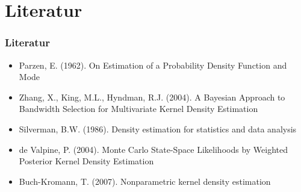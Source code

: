 \section{Literatur}

\begin{frame}[allowframebreaks]
	\frametitle{Literatur}

	\begin{itemize}
		\item Parzen, E. (1962). On Estimation of a Probability Density Function and Mode
		\item Zhang, X., King, M.L., Hyndman, R.J. (2004). A Bayesian Approach to Bandwidth Selection for Multivariate Kernel Density Estimation
		\item Silverman, B.W. (1986). Density estimation for statistics and data analysis
		\item de Valpine, P. (2004). Monte Carlo State-Space Likelihoods by Weighted Posterior Kernel Density Estimation
		\item Buch-Kromann, T. (2007). Nonparametric kernel density estimation
	\end{itemize}

\end{frame}

